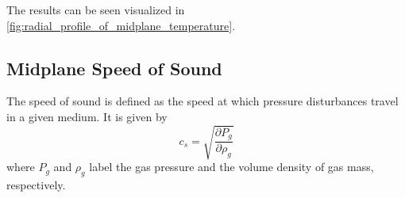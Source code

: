 


    The results can be seen visualized in \cref{fig:radial_profile_of_midplane_temperature}.

    


    \clearpage\subsection{Midplane Speed of Sound}

        The speed of sound is defined as the speed at which pressure disturbances travel in a 
        given medium. It is given by 
        \begin{equation}
            \label{eq:general_definition_of_sound_speed}
            c_s = \sqrt{\frac{\partial P_g}{\partial \rho_g}}
        \end{equation}
        where $P_g$ and $\rho_g$ label the gas pressure and the volume density of gas mass, respectively. 
        
